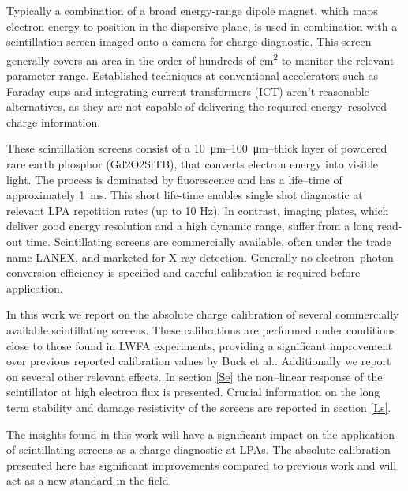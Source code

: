 \documentclass[%
reprint,
amsmath,
amssymb,
aip,
rsi, 
numerical,
floatfix,
]{revtex4-1}
\newcommand{\myCite}[1]{\textcolor{blue}{\cite{#1}}}
\begin{document}
Typically a combination of a broad energy-range dipole magnet, which maps electron energy to position in the dispersive plane, is used in combination with a scintillation screen imaged onto a camera for charge diagnostic. 
This screen generally covers an area in the order of hundreds of \si{\centi\metre^2} to monitor the relevant parameter range. 
Established techniques at conventional accelerators such as Faraday cups and integrating current transformers (ICT) aren't reasonable alternatives, as they are not capable of delivering the required energy--resolved charge information.

These scintillation screens consist of a \SIrange{10}{100}{\micro\meter}--thick layer of powdered rare earth phosphor (Gd2O2S:TB), that converts electron energy into visible light. 
The process is dominated by fluorescence and has a life--time of approximately \SI{1}{\milli\second}. 
This short life-time enables single shot diagnostic at relevant LPA repetition rates (up to 10 Hz). 
In contrast, imaging plates, which deliver good energy resolution and a high dynamic range\myCite{Tanaka2005,Masuda2008,Zeil2010,Bonnet2013}, suffer from a long read-out time.
Scintillating screens are commercially available, often under the trade name LANEX, and marketed for X-ray detection. 
Generally no electron--photon conversion efficiency is specified and careful calibration is required before application.

In this work we report on the absolute charge calibration of several commercially available scintillating screens. 
These calibrations are performed under conditions close to those found in LWFA experiments, providing a significant improvement over previous reported calibration values by Buck et al.\myCite{Buck2010}.
Additionally we report on several other relevant effects. 
In section \ref{Se} the non--linear response of the scintillator at high electron flux is presented. 
Crucial information on the long term stability and damage resistivity of the screens are reported in section \ref{Ls}.

The insights found in this work will have a significant impact on the application of scintillating screens as a charge diagnostic at LPAs. 
The absolute calibration presented here has significant improvements compared to previous work and  will act as a new standard in the field.  
\end{document}
